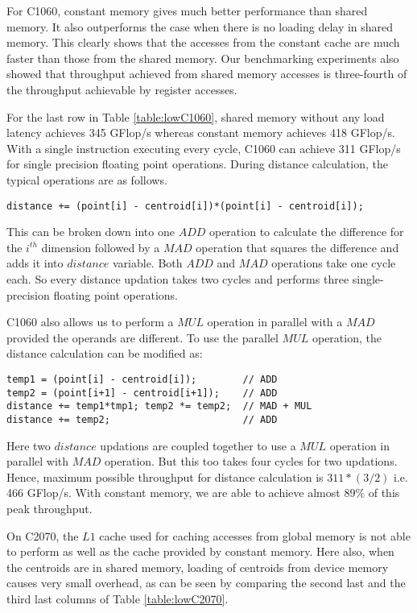 For C1060, constant memory gives much better performance than shared memory. It also outperforms the case when there is no loading delay in shared memory. This clearly shows that the accesses from the constant cache are much faster than those from the shared memory. Our benchmarking experiments also showed that throughput achieved from shared memory accesses is three-fourth of the throughput achievable by register accesses.

For the last row in Table \ref{table:lowC1060}, shared memory without any load latency achieves 345 GFlop/s whereas constant memory achieves 418 GFlop/s. With a single instruction executing every cycle, C1060 can achieve 311 GFlop/s for single precision floating point operations. During distance calculation, the typical operations are as follows.
\begin{lstlisting}[breaklines=true]
distance += (point[i] - centroid[i])*(point[i] - centroid[i]);
\end{lstlisting}

This can be broken down into one $ADD$ operation to calculate the difference for the $i^{th}$ dimension followed by a $MAD$ operation that squares the difference and adds it into $distance$ variable. Both $ADD$ and $MAD$ operations take one cycle each. So every distance updation takes two cycles and performs three single-precision floating point operations.

C1060 also allows us to perform a $MUL$ operation in parallel with a $MAD$ provided the operands are different. To use the parallel $MUL$ operation, the distance calculation can be modified as:
\begin{lstlisting}
temp1 = (point[i] - centroid[i]);        // ADD
temp2 = (point[i+1] - centroid[i+1]);    // ADD
distance += temp1*tmp1; temp2 *= temp2;  // MAD + MUL
distance += temp2;                       // ADD
\end{lstlisting}
Here two $distance$ updations are coupled together to use a $MUL$ operation in parallel with $MAD$ operation. But this too takes four cycles for two updations. Hence, maximum possible throughput for distance calculation is $311 * (3/2)$ i.e. 466 GFlop/s. With constant memory, we are able to achieve almost $89\%$ of this peak throughput.

On C2070, the $L1$ cache used for caching accesses from global memory is not able to perform as well as the cache provided by constant memory. Here also, when the centroids are in shared memory, loading of centroids from device memory causes very small overhead, as can be seen by comparing the second last and the third last columns of Table \ref{table:lowC2070}.


